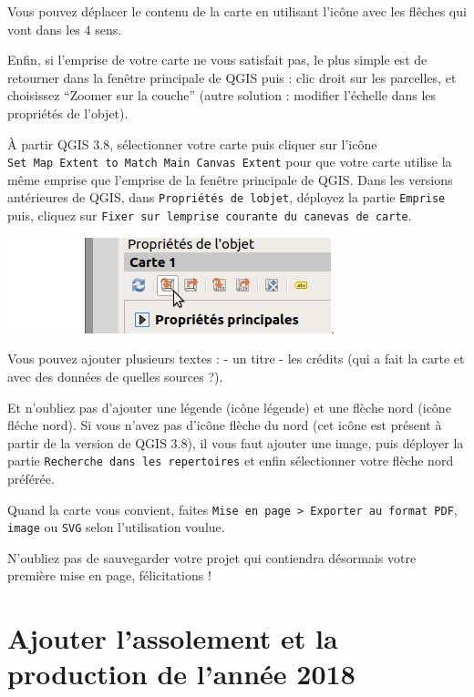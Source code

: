 Vous pouvez déplacer le contenu de la carte en utilisant l'icône avec
les flêches qui vont dans les 4 sens.

Enfin, si l'emprise de votre carte ne vous satisfait pas, le plus simple
est de retourner dans la fenêtre principale de QGIS puis : clic droit
sur les parcelles, et choisissez ``Zoomer sur la couche'' (autre
solution : modifier l'échelle dans les propriétés de l'objet).

À partir QGIS 3.8, sélectionner votre carte puis cliquer sur l'icône
\texttt{Set\ Map\ Extent\ to\ Match\ Main\ Canvas\ Extent} pour que
votre carte utilise la même emprise que l'emprise de la fenêtre
principale de QGIS. Dans les versions antérieures de QGIS, dans
\texttt{Propriétés\ de\ l\textquotesingle{}objet}, déployez la partie
\texttt{Emprise} puis, cliquez sur
\texttt{Fixer\ sur\ l\textquotesingle{}emprise\ courante\ du\ canevas\ de\ carte}.

\includegraphics{figures/composer_mapExtent.png}.

Vous pouvez ajouter plusieurs textes : - un titre - les crédits (qui a
fait la carte et avec des données de quelles sources ?).

Et n'oubliez pas d'ajouter une légende (icône légende) et une flèche
nord (icône fléche nord). Si vous n'avez pas d'icône flèche du nord (cet
icône est présent à partir de la version de QGIS 3.8), il vous faut
ajouter une image, puis déployer la partie
\texttt{Recherche\ dans\ les\ repertoires} et enfin sélectionner votre
flèche nord préférée.

Quand la carte vous convient, faites
\texttt{Mise\ en\ page\ \textgreater{}\ Exporter\ au\ format\ PDF},
\texttt{image} ou \texttt{SVG} selon l'utilisation voulue.

N'oubliez pas de sauvegarder votre projet qui contiendra désormais votre
première mise en page, félicitations !

\section{Ajouter l'assolement et la production de l'année
2018}\label{ajouter-lassolement-et-la-production-de-lannuxe9e-2018}

